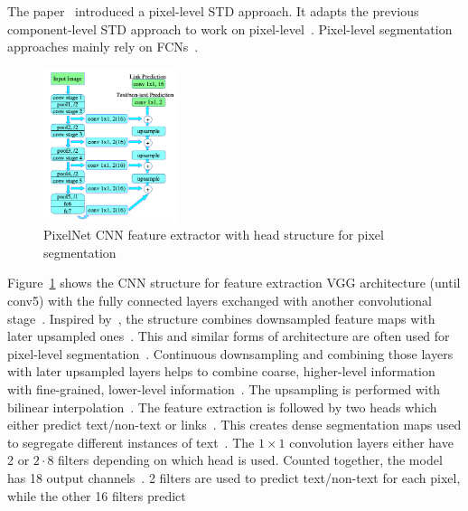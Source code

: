 The paper~\cite{deng_pixellink_2018} introduced a pixel-level \ac{STD} approach.
It adapts the previous component-level \ac{STD} approach to work on
pixel-level~\citep{deng_pixellink_2018}.
Pixel-level segmentation approaches mainly rely on \acp{FCN}~\citep{dai_fused_2018}.
\begin{figure}[ht]
    \centering
    \includegraphics[width=0.35\textwidth]{img/STD-seg-based-CNN-Deng-PixelLink-2018.png}
    \caption[Feature extractor and prediction head for pixel segmentation]{%
        PixelNet CNN feature extractor with head structure for pixel
        segmentation\label{fig:STD-segbased-pixel-CNN}
    }
\end{figure}
Figure~\ref{fig:STD-segbased-pixel-CNN} shows the \ac{CNN} structure for feature extraction
VGG architecture (until conv5) with the fully connected layers exchanged with
another convolutional stage~\citep{deng_pixellink_2018}.
Inspired by~\cite{long_fully_2015}, the structure combines downsampled feature maps with later
upsampled ones~\citep{deng_pixellink_2018}.
This and similar forms of architecture are often used for pixel-level
segmentation~\citep{deng_pixellink_2018,yao_scene_2016,wu_self-organized_2017,
long_textsnake_2018,wang_shape_2019}.
Continuous downsampling and combining those layers with later upsampled layers helps
to combine coarse, higher-level information with fine-grained, lower-level
information~\citep{long_fully_2015}.
The upsampling is performed with bilinear interpolation~\citep{deng_pixellink_2018}.
The feature extraction is followed by two heads which either predict text/non-text or
links~\citep{deng_pixellink_2018}.
This creates dense segmentation maps used to segregate different instances of
text~\citep{deng_pixellink_2018}.
The $1\times1$ convolution layers either have 2 or $2\cdot8$ filters depending on which head is used.
Counted together, the model has 18 output channels~\citep{deng_pixellink_2018}.
2 filters are used to predict text/non-text for each pixel, while the other 16 filters predict

